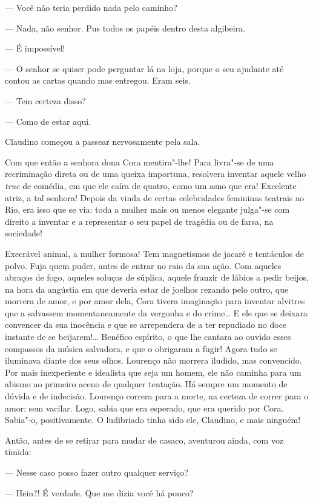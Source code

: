 --- Você não teria perdido nada pelo caminho?

--- Nada, não senhor. Pus todos os papéis dentro desta algibeira.

--- É impossível!

--- O senhor se quiser pode perguntar lá na loja, porque o seu ajudante
até contou as cartas quando mas entregou. Eram seis.

--- Tem certeza disso?

--- Como de estar aqui.

Claudino começou a passear nervosamente pela sala.

Com que então a senhora dona Cora mentira"-lhe! Para livra"-se de uma
recriminação direta ou de uma queixa importuna, resolvera inventar
aquele velho \emph{truc} de comédia, em que ele caíra de quatro, como um
asno que era! Excelente atriz, a tal senhora! Depois da vinda de certas
celebridades femininas teatrais ao Rio, era isso que se via: toda a
mulher mais ou menos elegante julga"-se com direito a inventar e a
representar o seu papel de tragédia ou de farsa, na sociedade!

Execrável animal, a mulher formosa! Tem magnetismos de jacaré e
tentáculos de polvo. Fuja quem puder, antes de entrar no raio da sua
ação. Com aqueles abraços de fogo, aqueles soluços de súplica, aquele
franzir de lábios a pedir beijos, na hora da angústia em que deveria
estar de joelhos rezando pelo outro, que morrera de amor, e por amor
dela, Cora tivera imaginação para inventar alvitres que a salvassem
momentaneamente da vergonha e do crime\ldots{} E ele que se deixara convencer
da sua inocência e que se arrependera de a ter repudiado no doce
instante de se beijarem!\ldots{} Benéfico espírito, o que lhe cantara ao
ouvido esses compassos da música salvadora, e que o obrigaram a fugir!
Agora tudo se iluminava diante dos seus olhos. Lourenço não morrera
iludido, mas convencido. Por mais inexperiente e idealista que seja um
homem, ele não caminha para um abismo ao primeiro aceno de qualquer
tentação. Há sempre um momento de dúvida e de indecisão. Lourenço
correra para a morte, na certeza de correr para o amor: sem vacilar.
Logo, sabia que era esperado, que era querido por Cora. Sabia"-o,
positivamente. O ludibriado tinha sido ele, Claudino, e mais ninguém!

Antão, antes de se retirar para mudar de casaco, aventurou ainda, com
voz tímida:

--- Nesse caso posso fazer outro qualquer serviço?

--- Hein?! É verdade. Que me dizia você há pouco?

